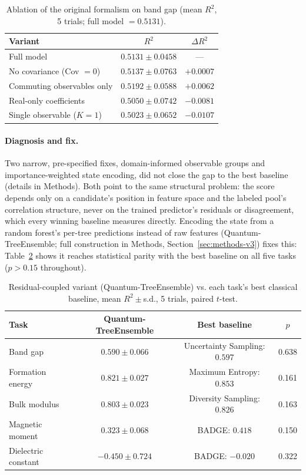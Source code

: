\documentclass[10pt]{article}
\begin{document}
\begin{table}[htbp]
\centering
\small
\caption{Ablation of the original formalism on band gap (mean $R^2$, 5 trials; full model $=0.5131$).}
\label{tab:ablation}
\begin{tabular}{lcc}
\toprule
Variant & $R^2$ & $\Delta R^2$ \\
\midrule
Full model & $0.5131 \pm 0.0458$ & --- \\
No covariance (Cov $=0$) & $0.5137 \pm 0.0763$ & $+0.0007$ \\
Commuting observables only & $0.5192 \pm 0.0588$ & $+0.0062$ \\
Real-only coefficients & $0.5050 \pm 0.0742$ & $-0.0081$ \\
Single observable ($K=1$) & $0.5023 \pm 0.0652$ & $-0.0107$ \\
\bottomrule
\end{tabular}
\end{table}

\paragraph{Diagnosis and fix.} Two narrow, pre-specified fixes, domain-informed observable groups and importance-weighted state encoding, did not close the gap to the best baseline (details in Methods). Both point to the same structural problem: the score depends only on a candidate's position in feature space and the labeled pool's correlation structure, never on the trained predictor's residuals or disagreement, which every winning baseline measures directly. Encoding the state from a random forest's per-tree predictions instead of raw features (Quantum-TreeEnsemble; full construction in Methods, Section~\ref{sec:methods-v3}) fixes this: Table~\ref{tab:v3} shows it reaches statistical parity with the best baseline on all five tasks ($p>0.15$ throughout).

\begin{table}[htbp]
\centering
\small
\caption{Residual-coupled variant (Quantum-TreeEnsemble) vs. each task's best classical baseline, mean $R^2\pm$s.d., 5 trials, paired $t$-test.}
\label{tab:v3}
\begin{tabular}{lccc}
\toprule
Task & Quantum-TreeEnsemble & Best baseline & $p$ \\
\midrule
Band gap & $0.590\pm0.066$ & Uncertainty Sampling: $0.597$ & 0.638 \\
Formation energy & $0.821\pm0.027$ & Maximum Entropy: $0.853$ & 0.161 \\
Bulk modulus & $0.803\pm0.023$ & Diversity Sampling: $0.826$ & 0.163 \\
Magnetic moment & $0.323\pm0.068$ & BADGE: $0.418$ & 0.150 \\
Dielectric constant & $-0.450\pm0.724$ & BADGE: $-0.020$ & 0.322 \\
\bottomrule
\end{tabular}
\end{table}
\end{document}
